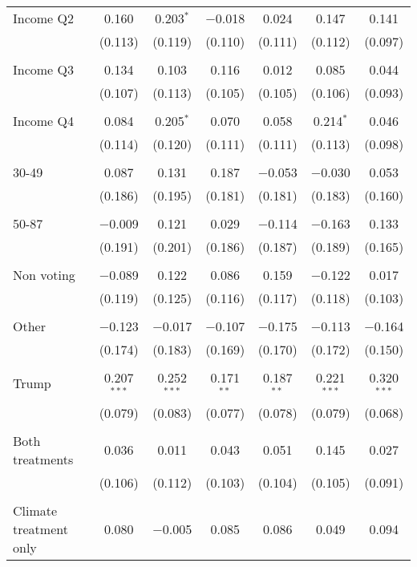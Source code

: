 \begin{tabular}{@{\extracolsep{5pt}}lcccccc}
 Income Q2 & 0.160 & 0.203$^{*}$ & $-$0.018 & 0.024 & 0.147 & 0.141 \\ 
  & (0.113) & (0.119) & (0.110) & (0.111) & (0.112) & (0.097) \\ 
  & & & & & & \\ 
 Income Q3 & 0.134 & 0.103 & 0.116 & 0.012 & 0.085 & 0.044 \\ 
  & (0.107) & (0.113) & (0.105) & (0.105) & (0.106) & (0.093) \\ 
  & & & & & & \\ 
 Income Q4 & 0.084 & 0.205$^{*}$ & 0.070 & 0.058 & 0.214$^{*}$ & 0.046 \\ 
  & (0.114) & (0.120) & (0.111) & (0.111) & (0.113) & (0.098) \\ 
  & & & & & & \\ 
 30-49 & 0.087 & 0.131 & 0.187 & $-$0.053 & $-$0.030 & 0.053 \\ 
  & (0.186) & (0.195) & (0.181) & (0.181) & (0.183) & (0.160) \\ 
  & & & & & & \\ 
 50-87 & $-$0.009 & 0.121 & 0.029 & $-$0.114 & $-$0.163 & 0.133 \\ 
  & (0.191) & (0.201) & (0.186) & (0.187) & (0.189) & (0.165) \\ 
  & & & & & & \\ 
 Non voting & $-$0.089 & 0.122 & 0.086 & 0.159 & $-$0.122 & 0.017 \\ 
  & (0.119) & (0.125) & (0.116) & (0.117) & (0.118) & (0.103) \\ 
  & & & & & & \\ 
 Other & $-$0.123 & $-$0.017 & $-$0.107 & $-$0.175 & $-$0.113 & $-$0.164 \\ 
  & (0.174) & (0.183) & (0.169) & (0.170) & (0.172) & (0.150) \\ 
  & & & & & & \\ 
 Trump & 0.207$^{***}$ & 0.252$^{***}$ & 0.171$^{**}$ & 0.187$^{**}$ & 0.221$^{***}$ & 0.320$^{***}$ \\ 
  & (0.079) & (0.083) & (0.077) & (0.078) & (0.079) & (0.068) \\ 
  & & & & & & \\ 
 Both treatments & 0.036 & 0.011 & 0.043 & 0.051 & 0.145 & 0.027 \\ 
  & (0.106) & (0.112) & (0.103) & (0.104) & (0.105) & (0.091) \\ 
  & & & & & & \\ 
 Climate treatment only & 0.080 & $-$0.005 & 0.085 & 0.086 & 0.049 & 0.094 \\ 

\end{tabular}
